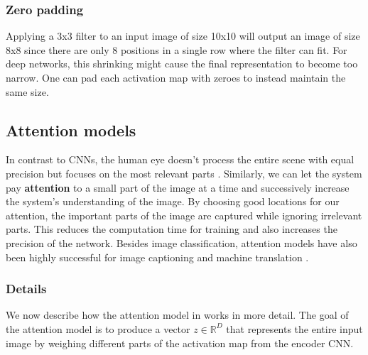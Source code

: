 \subsubsection{Zero padding}

Applying a 3x3 filter to an input image of size 10x10 will output an image of size 8x8 since there are only 8 positions in a single row where the filter can fit. For deep networks, this shrinking might cause the final representation to become too narrow.
One can pad each activation map with zeroes to instead maintain the same size.

\subsection{Attention models}



In contrast to CNNs, the human eye doesn't process the entire scene with equal precision but focuses on the most relevant parts \cite{DeepMindAttention}.
Similarly, we can let the system pay \textbf{attention} to a small part of the image at a time and successively increase the system's understanding of the image.
By choosing good locations for our attention, the important parts of the image are captured while ignoring irrelevant parts.
This reduces the computation time for training and also increases the precision of the network.
Besides image classification, attention models have also been highly successful for image captioning \cite{AttendAndTell} and machine translation \cite{machine_translation_attention}.

\subsubsection{Details}
We now describe how the attention model in \cite{AttendAndTell} works in more detail.
The goal of the attention model is to produce a vector $z \in \mathbb{R}^D$ that represents the entire input image by weighing different parts of the activation map from the encoder CNN.

